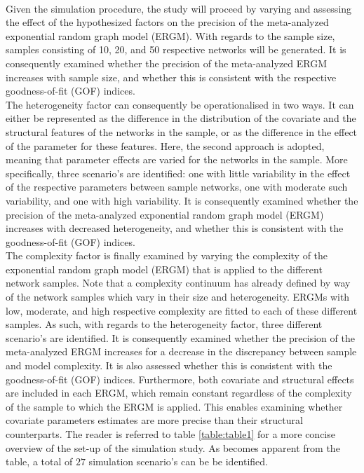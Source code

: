 \documentclass[a4paper, man, floatsintext]{apa6}
\begin{document}
\\ 
\clearpage Given the simulation procedure, the study will proceed by varying and assessing the effect of the hypothesized factors on the precision of the meta-analyzed exponential random graph model (ERGM). With regards to the sample size, samples consisting of 10, 20, and 50 respective networks will be generated.  It is consequently examined whether the precision of the meta-analyzed ERGM increases with sample size, and whether this is consistent with the respective goodness-of-fit (GOF) indices.
\\
The heterogeneity factor can consequently be operationalised in two ways. It can either be represented as the difference in the distribution of the covariate and the structural features of the networks in the sample, or as the difference in the effect of the parameter for these features. Here, the second approach is adopted, meaning that parameter effects are varied for the networks in the sample. More specifically, three scenario's are identified: one with little variability in the effect of the respective parameters between sample networks, one with moderate such variability, and one with high variability. It is consequently examined whether the precision of the meta-analyzed exponential random graph model (ERGM) increases with decreased heterogeneity, and whether this is consistent with the goodness-of-fit (GOF) indices. 
\\
The complexity factor is finally examined by varying the complexity of the exponential random graph model (ERGM) that is applied to the different network samples. Note that a complexity continuum has already defined by way of the network samples which vary in their size and heterogeneity. ERGMs with low, moderate, and high respective complexity are fitted to each of these different samples. As such, with regards to the heterogeneity factor, three different scenario's are identified. It is consequently examined whether the precision of the meta-analyzed ERGM increases for a decrease in the discrepancy between sample and model complexity. It is also assessed whether this is consistent with the goodness-of-fit (GOF) indices. Furthermore, both covariate and structural effects are included in each ERGM, which remain constant regardless of the complexity of the sample to which the ERGM is applied. This enables examining whether covariate parameters estimates are more precise than their structural counterparts. \clearpage \noindent The reader is referred to table \ref{table:table1} for a more concise overview of the set-up of the simulation study. As becomes apparent from the table, a total of $27$  simulation scenario's can be be identified.
\end{document}
